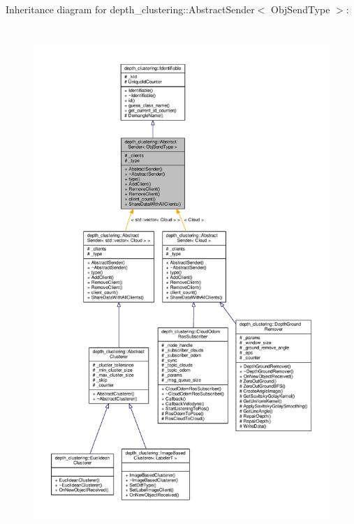 Inheritance diagram for depth\-\_\-clustering\-:\-:Abstract\-Sender$<$ Obj\-Send\-Type $>$\-:
\nopagebreak
\begin{figure}[H]
\begin{center}
\leavevmode
\includegraphics[height=550pt]{classdepth__clustering_1_1AbstractSender__inherit__graph}
\end{center}
\end{figure}


